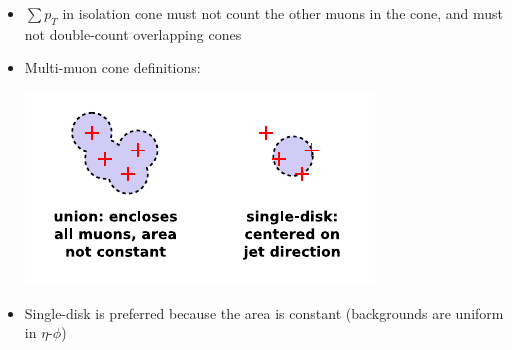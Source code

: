 \documentclass[compress]{beamer}
\begin{document}
\begin{frame}
\begin{columns}

\begin{itemize}
\item $\sum p_T$ in isolation cone must not count the other muons in
  the cone, and must not double-count overlapping cones

\item Multi-muon cone definitions:

\includegraphics[width=\linewidth]{isolation_variables.pdf}

\item Single-disk is preferred because the area is constant
  (backgrounds are uniform in $\eta$-$\phi$)
\end{itemize}
\end{columns}
\end{frame}
\end{document}
